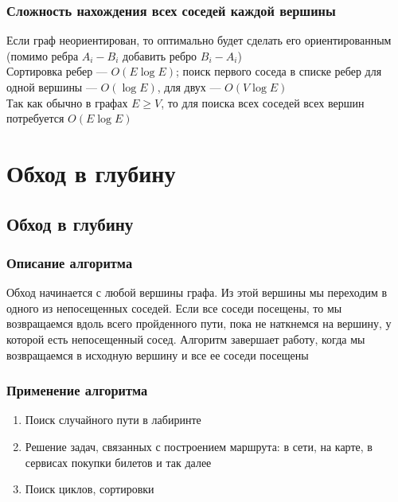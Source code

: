 \documentclass[a4paper]{article}
\begin{document}
\subsubsection*{Сложность нахождения всех соседей каждой вершины}
Если граф неориентирован, то оптимально будет сделать его ориентированным (помимо ребра $A_i-B_i$ добавить ребро $B_i-A_i$)\\[2mm]
\indent Сортировка ребер — $O(E\log E)$; поиск первого соседа в списке ребер для одной вершины — $O(\log E)$, для двух — $O(V\log E)$\\[2mm]
Так как обычно в графах $E\geqslant V$, то для поиска всех соседей всех вершин потребуется $O(E\log E)$





\section{Обход в глубину}
\subsection{Обход в глубину}
\subsubsection*{Описание алгоритма}
Обход начинается с любой вершины графа. Из этой вершины мы переходим в одного из непосещенных соседей. Если все соседи посещены, то мы возвращаемся вдоль всего пройденного пути, пока не наткнемся на вершину, у которой есть непосещенный сосед. Алгоритм завершает работу, когда мы возвращаемся в исходную вершину и все ее соседи посещены
\subsubsection*{Применение алгоритма}
\begin{enumerate}
    \item Поиск случайного пути в лабиринте
    \item Решение задач, связанных с построением маршрута: в сети, на карте, в сервисах покупки билетов и так далее
    \item Поиск циклов, сортировки
\end{enumerate}
\end{document}
